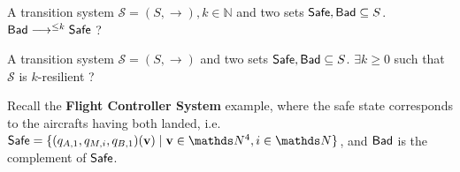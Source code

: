 {A transition system $\mathscr{S}=(S,\rightarrow), k \in \mathbb{N}$ and two sets $\Safe, \Bad \subseteq S$.}
{$\Bad \longrightarrow^{\leq k} \Safe$ ?\newline}

{A transition system $\mathscr{S}=(S,\rightarrow)$ and two sets $\Safe, \Bad \subseteq S$.}
{$\exists k \geq 0$ such that $\mathscr{S}$ is %
 $k$-resilient ?\newline}


\iffalse

\problemx{Resilience problems}
{A transition system $\mathscr{S}=(S,\rightarrow)$, two sets $\Safe, \Bad \subseteq S$, $k \in \mathbb{N}$.}
{ ({\sc resilience problem (RP)}) $\Bad \longrightarrow^{*} \Safe$ ?\newline  
({\sc $k$-resilience problem (kRP)})		$\Bad \longrightarrow^{\leq k} \Safe$ ?\newline
({\sc bounded resilience problem (BRP)})	$\exists k \geq 0$ such that $\mathscr{S}$ is 
 $k$-resilient ?\newline}

\fi



Recall the {\bf Flight Controller System} example, where the safe state corresponds to the aircrafts having both landed, i.e.
$\Safe = \{(q_{A,1}, q_{M,i}, q_{B,1})(\textbf{v}) \mid \textbf{v} \in \N^4, i \in \N\}$,
and $\Bad$ is the complement of $\Safe$. 

\iffalse
\begin{example}
Let us consider a VASS with only one state $q$, one counter, and one transition that substracts $-1$ from the counter, with $\Safe = \downarrow q(0)$, $\Bad = \uparrow q(1)$,
then resilience hold but not bounded resilience: for every bound $k$ there is an element of $\Bad$ e.g. $q(k+1)$ which necessitate at least $k+1$ steps before it can reach $\Safe$. 
\end{example}
\fi


